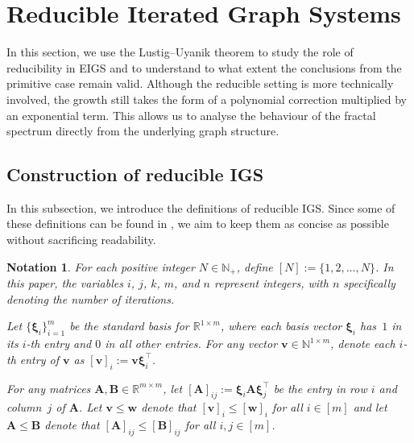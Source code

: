 \documentclass[12pt]{iopart}
\newtheorem{notation}[theorem]{Notation}
\newcommand*{\bbbxi}{\boldsymbol{\xi}}
\begin{document}
\section{Reducible Iterated Graph Systems}
In this section, we use the Lustig--Uyanik theorem to study the role of reducibility in EIGS and to understand to what extent the conclusions from the primitive case remain valid.
Although the reducible setting is more technically involved, the growth still takes the form of a polynomial correction multiplied by an exponential term.
This allows us to analyse the behaviour of the fractal spectrum directly from the underlying graph structure.


\subsection{Construction of reducible IGS}

In this subsection, we introduce the definitions of reducible IGS. 
Since some of these definitions can be found in \cite{li2024scale,neroli2024fractal}, 
we aim to keep them as concise as possible without sacrificing readability.

\begin{notation}
For each positive integer $N\in\mathbb{N}_+$, 
define $[N] := \{1,2,\ldots,N\}$.
In this paper, the variables $i$, $j$, $k$, $m$, and $n$ represent integers, 
with $n$ specifically denoting the number of iterations.

Let $\{\bbbxi_i\}_{i=1}^m $ be the standard basis for $\mathbb{R}^{1\times m}$, 
where each basis vector $\bbbxi_i$ has~$1$ in its $i$-th entry and $0$ in all other entries.
For any vector $\mathbf{v}\in\mathbb{N}^{1\times m}$, 
denote each $i$-th entry of $\mathbf{v}$ as $[\mathbf{v}]_i := \mathbf{v} \bbbxi_i^\top$.

For any matrices $\mathbf{A},\mathbf{B}\in\mathbb{R}^{m\times m}$, 
let $[\mathbf{A}]_{ij}:=\bbbxi_i \mathbf{A} \bbbxi_j^\top$ be the entry in row $i$ and column~$j$ of $\mathbf{A}$.
Let $\mathbf{v} \leq \mathbf{w}$ denote that $[\mathbf{v}]_i \leq [\mathbf{w}]_i$  for all $i \in [m]$ and
let $\mathbf{A} \leq \mathbf{B}$ denote that $[\mathbf{A}]_{ij}\leq [\mathbf{B}]_{ij}$ for all $i,j\in[m]$.
\end{notation}
\end{document}
